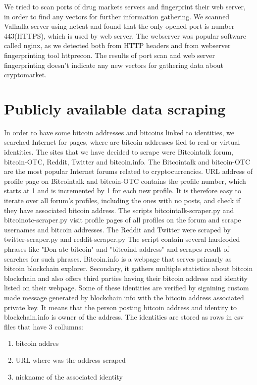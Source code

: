 \documentclass[
  digital, %
  table,   %
  lof,     %
  lot,     %
  oneside
]{fithesis3}
\begin{document}
We tried to scan ports of drug markets servers and fingerprint their web server,
in order to find any vectors for further information gathering.
We scanned Valhalla server using netcat and found that the only opened port is number 443(HTTPS),
which is used by web server. The webserver was popular software called nginx, as we detected
both from HTTP headers and from webserver fingerprinting tool httprecon.
The results of port scan and web server fingerprinting doesn't indicate
any new vectors for gathering data about cryptomarket.

\section{Publicly available data scraping}
\label{Publicly available data scraping}

In order to have some bitcoin addresses and bitcoins linked to identities,
we searched Internet for pages, where are bitcoin addresses tied to real or virtual identities.
The sites that we have decided to scrape were Bitcointalk forum, bitcoin-OTC, Reddit,
Twitter and bitcoin.info.
The Bitcointalk and bitcoin-OTC are the most popular Internet forums
related to cryptocurrencies. URL address of profile page on Bitcointalk
and bitcoin-OTC contains the profile number, which starts at 1 and is  incremented by 1
for each new profile. 
It is therefore easy to iterate over all forum's profiles,
including the ones with no posts, and check if they have associated bitcoin address.
The scripts bitcointalk-scraper.py and bitcoinotc-scraper.py
visit profile pages of all profiles on the forum and scrape usernames and bitcoin addresses. 
The Reddit and Twitter were scraped by twitter-scraper.py and reddit-scraper.py
The script contain several hardcoded phrases like "Don
ate bitcoin" and "bitcoind address" and scrapes 
result of searches for such phrases.
Bitcoin.info is a webpage that serves primarly as bitcoin blockchain explorer. Secondary,
it gathers multiple statistics about bitcoin blockchain and also offers
third parties having their bitcoin address and identity listed on their webpage.
Some of these identities are verified by signining
custom made message generated by blockchain.info
with the bitcoin address associated private key. It means that the person
posting bitcoin address and identity to blockchain.info is owner of the address.
The identities are stored as rows in csv files that have 3 collumns:

\begin{enumerate}
 \item bitcoin addres
 \item URL where was the address scraped
 \item nickname of the associated identity
\end{enumerate}
\end{document}
